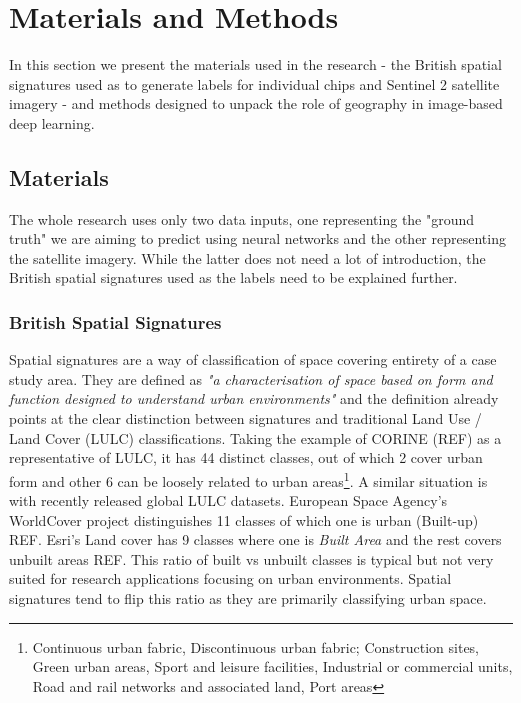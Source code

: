 \section{Materials and Methods}
\label{sec:matmet}

In this section we present the materials used in the research - the British spatial
signatures used as to generate labels for individual chips and Sentinel 2 satellite
imagery - and methods designed to unpack the role of geography in image-based deep
learning.

\subsection{Materials}

The whole research uses only two data inputs, one representing the "ground truth" we are
aiming to predict using neural networks and the other representing the satellite
imagery. While the latter does not need a lot of introduction, the British spatial
signatures used as the labels need to be explained further.

\subsubsection{British Spatial Signatures}

Spatial signatures are a way of classification of space covering entirety of a case
study area. They are defined as \textit{"a characterisation of space based on form and
function designed to understand urban environments"} \citep{dab_mf_2021a} and the
definition already points at the clear distinction between signatures and traditional
Land Use / Land Cover (LULC) classifications. Taking the example of CORINE (REF) as a
representative of LULC, it has 44 distinct classes, out of which 2 cover urban form and
other 6 can be loosely related to urban areas\footnote{Continuous urban fabric,
Discontinuous urban fabric; Construction sites, Green urban areas, Sport and leisure
facilities, Industrial or commercial units, Road and rail networks and associated land,
Port areas}. A similar situation is with recently released global LULC datasets.
European Space Agency's WorldCover project distinguishes 11 classes of which one is
urban (Built-up) REF. Esri's Land cover has 9 classes where one is \textit{Built Area}
and the rest covers unbuilt areas REF. This ratio of built vs unbuilt classes is typical
but not very suited for research applications focusing on urban environments. Spatial
signatures tend to flip this ratio as they are primarily classifying urban space.

